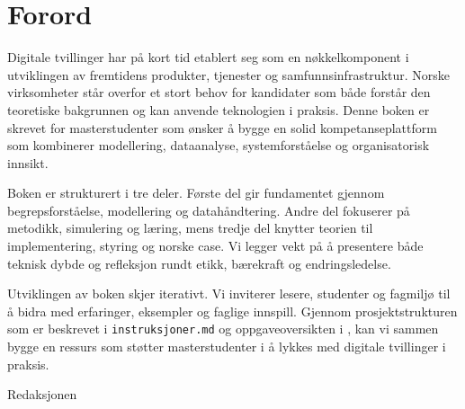 \chapter*{Forord}

Digitale tvillinger har på kort tid etablert seg som en nøkkelkomponent i utviklingen av fremtidens produkter, tjenester og samfunnsinfrastruktur. Norske virksomheter står overfor et stort behov for kandidater som både forstår den teoretiske bakgrunnen og kan anvende teknologien i praksis. Denne boken er skrevet for masterstudenter som ønsker å bygge en solid kompetanseplattform som kombinerer modellering, dataanalyse, systemforståelse og organisatorisk innsikt.

Boken er strukturert i tre deler. Første del gir fundamentet gjennom begrepsforståelse, modellering og datahåndtering. Andre del fokuserer på metodikk, simulering og læring, mens tredje del knytter teorien til implementering, styring og norske case. Vi legger vekt på å presentere både teknisk dybde og refleksjon rundt etikk, bærekraft og endringsledelse.

Utviklingen av boken skjer iterativt. Vi inviterer lesere, studenter og fagmiljø til å bidra med erfaringer, eksempler og faglige innspill. Gjennom prosjektstrukturen som er beskrevet i \texttt{instruksjoner.md} og oppgaveoversikten i \texttt{}, kan vi sammen bygge en ressurs som støtter masterstudenter i å lykkes med digitale tvillinger i praksis.

\bigskip
\begin{flushright}
Redaksjonen
\end{flushright}
